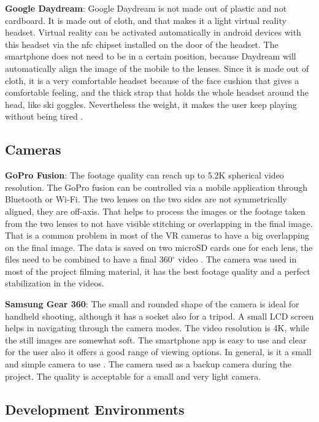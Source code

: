 \textbf{Google Daydream}: Google Daydream is not made out of plastic and not cardboard. It is made out of cloth, and that makes it a light virtual reality headset. Virtual reality can be activated automatically in android devices with this headset via the \acrfull{nfc} chipset installed on the door of the headset. The smartphone does not need to be in a certain position, because Daydream will automatically align the image of the mobile to the lenses. Since it is made out of cloth, it is a very comfortable headset because of the face cushion that gives a comfortable feeling, and the thick strap that holds the whole headset around the head, like ski goggles. Nevertheless the weight, it makes the user keep playing without being tired \citep{Amadeo2016DaydreamTechnica}. 


\subsection{Cameras}
\textbf{GoPro Fusion}: The footage quality can reach up to 5.2K spherical video resolution. The GoPro fusion can be controlled via a mobile application through Bluetooth or Wi-Fi. The two lenses on the two
sides are not symmetrically aligned, they are off-axis. That helps to
process the images or the footage taken from the two lenses to not
have visible stitching or overlapping in the final image. That is a
common problem in most of the VR cameras to have a big overlapping on the final image. The data is saved on two microSD cards one for each lens, the files need to be combined to have
a final 360$^{\circ}$ video \citep{Easton2018}. The camera was used in most of the project filming material, it has the best footage quality and a perfect stabilization in the videos.


\textbf{Samsung Gear 360}: The small and rounded shape of the camera is ideal for handheld shooting, although it has a socket also for a tripod. A small LCD screen helps in navigating through the camera modes. The video resolution is 4K, while the still images are somewhat soft. The smartphone app is easy to use and clear for the user also it offers a good range of viewing options. In general, is it a small and simple camera to use \citep{DigitalCamera2018}. The camera used as a backup camera during the project. The quality is acceptable for a small and very light camera.

\subsection{Development Environments}

